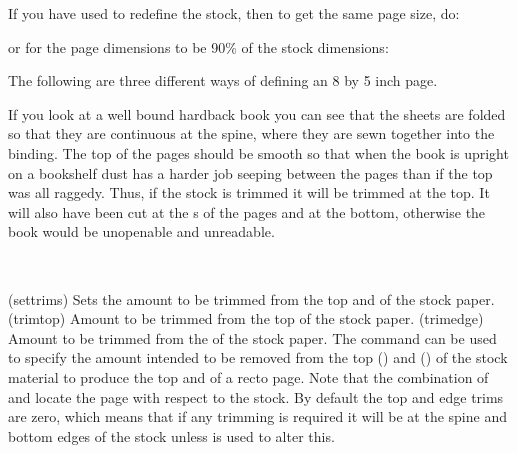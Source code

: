     If you have used \cmd{\setstocksize} to redefine the stock, 
then to get the same page size, do:
\begin{lcode}
\settrimmedsize{\stockheight}{\stockwidth}{*}
\end{lcode}
or for the page dimensions to be 90\% of the stock dimensions:
\begin{lcode}
\settrimmedsize{0.9\stockheight}{0.9\stockwidth}{*}
\end{lcode}

    The following are three different ways of defining an 8 by 5 inch page.
\begin{lcode}
\settrimmedsize{8in}{5in}{*}
\end{lcode}

If you look at a well bound hardback book you
can see that the sheets are folded so that they are continuous at the spine, 
where they are sewn together into the binding. The top of the pages should be
smooth so that when the book is upright on a bookshelf dust has a harder 
job seeping between the pages than if the top was all raggedy. Thus, if
the stock is trimmed it will be trimmed at the top. 
It will also have been
cut at the \foredge s of the pages and at the bottom, otherwise the book
would be unopenable and unreadable.

\begin{syntax}
\cmd{\settrims} \\
\end{syntax}
\glossary(settrims)%
  {}%
  {Sets the amount to be trimmed from the top and \foredge{} of the stock paper.}
\glossary(trimtop)%
  {}%
  {Amount to be trimmed from the top of the stock paper.}
\glossary(trimedge)%
  {}%
  {Amount to be trimmed from the \foredge{} of the stock paper.}
The command \cmd{\settrims} can be used to specify 
the amount intended to be removed from the top 
() and \foredge{} () of the 
stock 
material to produce the top and \foredge{} of a recto page. 
Note that the combination of \cmd{\settrims} and \cmd{\settrimmedsize}
locate the page with respect to the stock.
By default the top and edge trims are zero, which means that if any trimming
is required it will be at the spine and bottom edges of the stock
unless \cmd{\settrims} is used to alter this.

